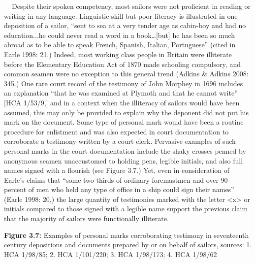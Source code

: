 \begin{styleStandard}
\textbf{\ \ }Despite their spoken competency, most sailors were not proficient in reading or writing in any language. Linguistic skill but poor literacy is illustrated in one deposition of a sailor, “sent to sea at a very tender age as cabin-boy and had no education...he could never read a word in a book…[but] he has been so much abroad as to be able to speak French, Spanish, Italian, Portuguese” (cited in Earle 1998: 21.) Indeed, most working class people in Britain were illiterate before the Elementary Education Act of 1870 made schooling compulsory, and common seamen were no exception to this general trend (Adkins \& Adkins 2008: 345.) One rare court record of the testimony of John Morphey in 1696 includes an explanation “that he was examined at Plymoth and that he cannot write” [HCA 1/53/9,] and in a context when the illiteracy of sailors would have been assumed, this may only be provided to explain why the deponent did not put his mark on the document. Some type of personal mark would have been a routine procedure for enlistment and was also expected in court documentation to corroborate a testimony written by a court clerk. Pervasive examples of such personal marks in the court documentation include the shaky crosses penned by anonymous seamen unaccustomed to holding pens, legible initials, and also full names signed with a flourish (see Figure 3.7.) Yet, even in consideration of Earle’s claims that “some two-thirds of ordinary foremastmen and over 90 percent of men who held any type of office in a ship could sign their names” (Earle 1998: 20,) the large quantity of testimonies marked with the letter {\textless}x{\textgreater} or initials compared to those signed with a legible name support the previous claim that the majority of sailors were functionally illiterate. 
\end{styleStandard}


\begin{styleStandard}
  [Warning: Image ignored] %
 
\end{styleStandard}


\begin{styleStandard}
\textbf{Figure 3.7: }Examples of personal marks corroborating testimony in seventeenth century depositions and documents prepared by or on behalf of sailors, sources: 1. HCA 1/98/85; 2. HCA 1/101/220; 3. HCA 1/98/173; 4. HCA 1/98/62
\end{styleStandard}


